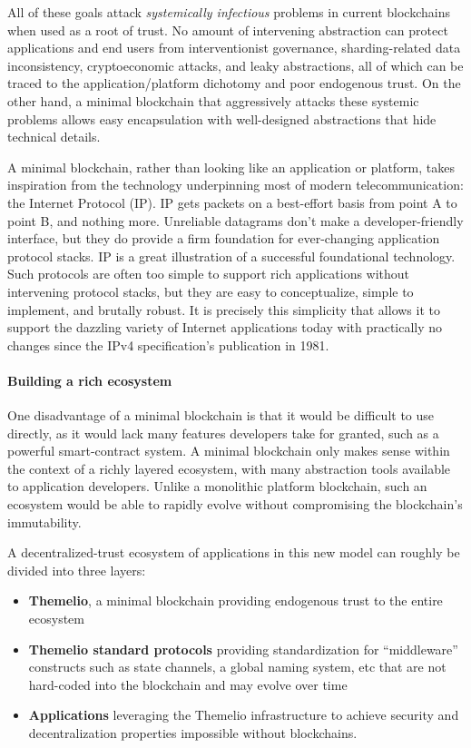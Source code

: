 \documentclass[]{article}
\providecommand{\tightlist}{%
  \setlength{\itemsep}{0pt}\setlength{\parskip}{0pt}}
\let\oldparagraph\paragraph
\renewcommand{\paragraph}[1]{\oldparagraph{#1}\mbox{}}
\begin{document}
All of these goals attack \emph{systemically infectious} problems in
current blockchains when used as a root of trust. No amount of
intervening abstraction can protect applications and end users from
interventionist governance, sharding-related data inconsistency,
cryptoeconomic attacks, and leaky abstractions, all of which can be
traced to the application/platform dichotomy and poor endogenous trust.
On the other hand, a minimal blockchain that aggressively attacks these
systemic problems allows easy encapsulation with well-designed
abstractions that hide technical details.

A minimal blockchain, rather than looking like an application or
platform, takes inspiration from the technology underpinning most of
modern telecommunication: the Internet Protocol (IP). IP gets packets on
a best-effort basis from point A to point B, and nothing more.
Unreliable datagrams don't make a developer-friendly interface, but they
do provide a firm foundation for ever-changing application protocol
stacks. IP is a great illustration of a successful foundational
technology. Such protocols are often too simple to support rich
applications without intervening protocol stacks, but they are easy to
conceptualize, simple to implement, and brutally robust. It is precisely
this simplicity that allows it to support the dazzling variety of
Internet applications today with practically no changes since the IPv4
specification's publication in 1981.

\hypertarget{building-a-rich-ecosystem}{%
\paragraph{Building a rich ecosystem}\label{building-a-rich-ecosystem}}

One disadvantage of a minimal blockchain is that it would be difficult
to use directly, as it would lack many features developers take for
granted, such as a powerful smart-contract system. A minimal blockchain
only makes sense within the context of a richly layered ecosystem, with
many abstraction tools available to application developers. Unlike a
monolithic platform blockchain, such an ecosystem would be able to
rapidly evolve without compromising the blockchain's immutability.

A decentralized-trust ecosystem of applications in this new model can
roughly be divided into three layers:

\begin{itemize}
\tightlist
\item
  \textbf{Themelio}, a minimal blockchain providing endogenous trust to
  the entire ecosystem
\item
  \textbf{Themelio standard protocols} providing standardization for
  ``middleware'' constructs such as state channels, a global naming
  system, etc that are not hard-coded into the blockchain and may evolve
  over time
\item
  \textbf{Applications} leveraging the Themelio infrastructure to
  achieve security and decentralization properties impossible without
  blockchains.
\end{itemize}
\end{document}
